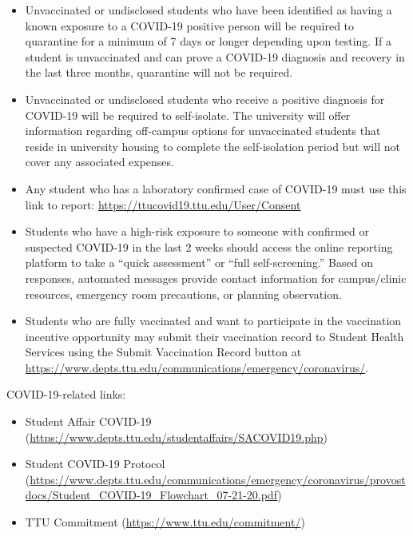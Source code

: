 \documentclass[12pt, notitlepage]{article}   	%
\begin{document}
{\begin{itemize}
{	Students that are vaccinated, including those with medical and religious exemptions, 
	and live in university housing will be provided with a location to complete the self-isolation 
	period. If an off-campus location is necessary, the university will cover the associated housing expenses.}
	\item{Unvaccinated or undisclosed students who have been identified as having a known exposure to
	a COVID-19 positive person will be required to quarantine for a minimum of 7 days or 
	longer depending upon testing. If a student is unvaccinated and can prove a COVID-19 
	diagnosis and recovery in the last three months, quarantine will not be required.}
	\item{Unvaccinated or undisclosed students who receive a positive diagnosis for 
	COVID-19 will be required to self-isolate. The university will offer information 
	regarding off-campus options for unvaccinated students that reside in university 
	housing to complete the self-isolation period but will not cover any associated expenses.}
	\item{Any student who has a laboratory confirmed case of COVID-19 must use this link to report:
	\url{https://ttucovid19.ttu.edu/User/Consent}}
	\item{Students who have a high-risk exposure to someone with confirmed or suspected COVID-19 in
	the last 2 weeks should access the online reporting platform to take a “quick assessment” 
	or “full self-screening.” Based on responses, automated messages provide contact 
	information for campus/clinic resources, emergency room precautions, or planning observation.}
	\item{Students who are fully vaccinated and want to participate in the vaccination 
	incentive opportunity may submit their vaccination record to Student Health Services 
	using the Submit Vaccination Record button at \url{https://www.depts.ttu.edu/communications/emergency/coronavirus/}.}
\end{itemize}

COVID-19-related links:
\begin{itemize}
	\item{Student Affair COVID-19 (\url{https://www.depts.ttu.edu/studentaffairs/SACOVID19.php})}
	\item{Student COVID-19 Protocol (\url{https://www.depts.ttu.edu/communications/emergency/coronavirus/provostdocs/Student_COVID-19_Flowchart_07-21-20.pdf})}
	\item{TTU Commitment (\url{https://www.ttu.edu/commitment/})}
\end{itemize}

}
\end{document}
